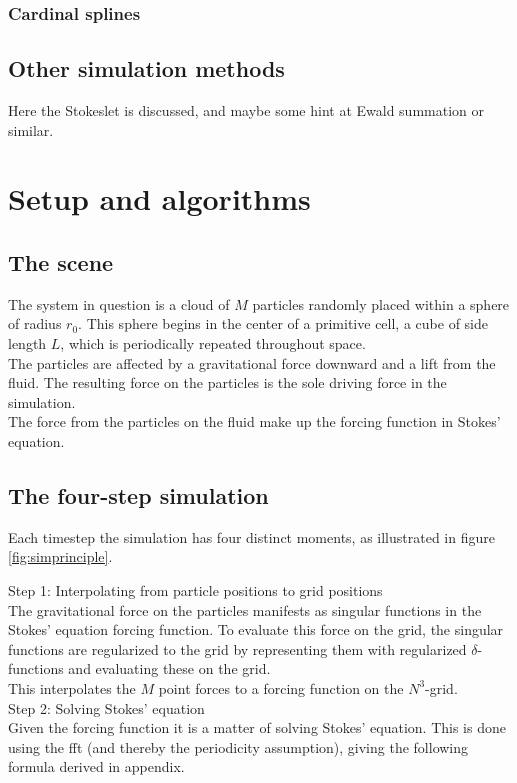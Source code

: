 \documentclass[a4paper,twoside=false,abstract=false,numbers=noenddot,
titlepage=false,headings=small,parskip=half,version=last]{scrartcl}
\begin{document}
\subsubsection{Cardinal splines}

\subsection{Other simulation methods}
Here the Stokeslet is discussed, and maybe some hint at Ewald summation or similar.

\section{Setup and algorithms}
\subsection{The scene}
The system in question is a cloud of $M$ particles randomly placed within a sphere of radius $r_0$. This sphere begins in the center of a primitive cell, a cube of side length $L$, which is periodically repeated throughout space.\\
The particles are affected by a gravitational force downward and a lift from the fluid. The resulting force on the particles is the sole driving force in the simulation.\\
The force from the particles on the fluid make up the forcing function in Stokes' equation.
\subsection{The four-step simulation}

Each timestep the simulation has four distinct moments, as illustrated in figure \ref{fig:simprinciple}.

Step 1: Interpolating from particle positions to grid positions\\
The gravitational force on the particles manifests as singular functions in the Stokes' equation forcing function. To evaluate this force on the grid, the singular functions are regularized to the grid by representing them with regularized $\delta$-functions and evaluating these on the grid.\\ This interpolates the $M$ point forces to a forcing function on the $N^3$-grid.\\
Step 2: Solving Stokes' equation\\
Given the forcing function it is a matter of solving Stokes' equation. This is done using the fft (and thereby the periodicity assumption), giving the following formula derived in appendix.
\end{document}
